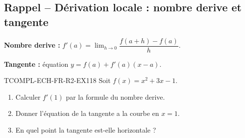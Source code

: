 

\subsection*{Rappel -- Dérivation locale : nombre derive et tangente}

\textbf{Nombre derive :} $f'(a) = \lim_{h \to 0} \dfrac{f(a+h) - f(a)}{h}$.

\textbf{Tangente :} équation $y = f(a) + f'(a)(x - a)$.

\begin{exercice}{TCOMPL-ECH-FR-R2-EX1}{1}{8}
Soit $f(x) = x^2 + 3x - 1$.
\begin{enumerate}
  \item Calculer $f'(1)$ par la formule du nombre derive.
  \item Donner l'équation de la tangente a la courbe en $x = 1$.
  \item En quel point la tangente est-elle horizontale ?
\end{enumerate}
\end{exercice}

